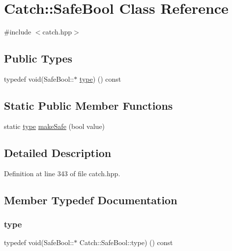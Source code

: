 \hypertarget{class_catch_1_1_safe_bool}{}\section{Catch\+:\+:Safe\+Bool Class Reference}
\label{class_catch_1_1_safe_bool}


{\ttfamily \#include $<$catch.\+hpp$>$}

\subsection*{Public Types}
\begin{DoxyCompactItemize}
\item 
typedef void(Safe\+Bool\+::$\ast$ \hyperlink{class_catch_1_1_safe_bool_a39eef9baed296299d625a54d54a2a958}{type}) () const
\end{DoxyCompactItemize}
\subsection*{Static Public Member Functions}
\begin{DoxyCompactItemize}
\item 
static \hyperlink{class_catch_1_1_safe_bool_a39eef9baed296299d625a54d54a2a958}{type} \hyperlink{class_catch_1_1_safe_bool_af0ea63d9820f8bf7a8b76377913c4e77}{make\+Safe} (bool value)
\end{DoxyCompactItemize}


\subsection{Detailed Description}


Definition at line 343 of file catch.\+hpp.



\subsection{Member Typedef Documentation}
\hypertarget{class_catch_1_1_safe_bool_a39eef9baed296299d625a54d54a2a958}{}\label{class_catch_1_1_safe_bool_a39eef9baed296299d625a54d54a2a958} 
\subsubsection{\texorpdfstring{type}{type}}
{\footnotesize\ttfamily typedef void(Safe\+Bool\+::$\ast$ Catch\+::\+Safe\+Bool\+::type) () const}



